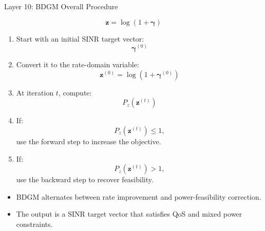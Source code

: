 \documentclass{beamer}
\begin{document}
\begin{frame}{Layer 10: BDGM Overall Procedure}
\scriptsize

\[
\mathbf{z}=\log(1+\boldsymbol{\gamma})
\]

\begin{enumerate}
    \item Start with an initial SINR target vector:
    \[
        \boldsymbol{\gamma}^{(0)}
    \]

    \item Convert it to the rate-domain variable:
    \[
        \mathbf{z}^{(0)}=\log(1+\boldsymbol{\gamma}^{(0)})
    \]

    \item At iteration \(t\), compute:
    \[
        P_z(\mathbf{z}^{(t)})
    \]

    \item If:
    \[
        P_z(\mathbf{z}^{(t)})\le1,
    \]
    use the forward step to increase the objective.

    \item If:
    \[
        P_z(\mathbf{z}^{(t)})>1,
    \]
    use the backward step to recover feasibility.
\end{enumerate}

\begin{itemize}
    \item BDGM alternates between rate improvement and power-feasibility correction.
    \item The output is a SINR target vector that satisfies QoS and mixed power constraints.
\end{itemize}

\end{frame}
\end{document}
